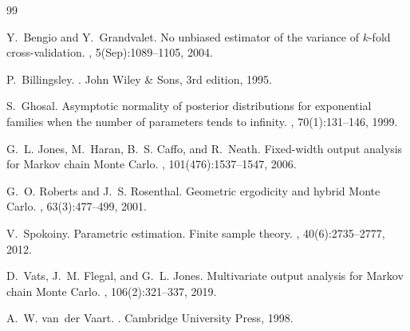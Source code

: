 \documentclass[12pt]{article}
\begin{document}
\begin{thebibliography}{99}

Y.~Bengio and Y.~Grandvalet.
\newblock No unbiased estimator of the variance of $k$-fold cross-validation.
, 5(Sep):1089--1105, 2004.

P.~Billingsley.
.
\newblock John Wiley \& Sons, 3rd edition, 1995.

S.~Ghosal.
\newblock Asymptotic normality of posterior distributions for exponential families when the number of parameters tends to infinity.
, 70(1):131--146, 1999.

G.~L. Jones, M.~Haran, B.~S. Caffo, and R.~Neath.
\newblock Fixed-width output analysis for Markov chain Monte Carlo.
, 101(476):1537--1547, 2006.

G.~O. Roberts and J.~S. Rosenthal.
\newblock Geometric ergodicity and hybrid Monte Carlo.
, 63(3):477--499, 2001.

V.~Spokoiny.
\newblock Parametric estimation. Finite sample theory.
, 40(6):2735--2777, 2012.

D.~Vats, J.~M. Flegal, and G.~L. Jones.
\newblock Multivariate output analysis for Markov chain Monte Carlo.
, 106(2):321--337, 2019.

A.~W. van~der Vaart.
.
\newblock Cambridge University Press, 1998.

\end{thebibliography}
\end{document}
